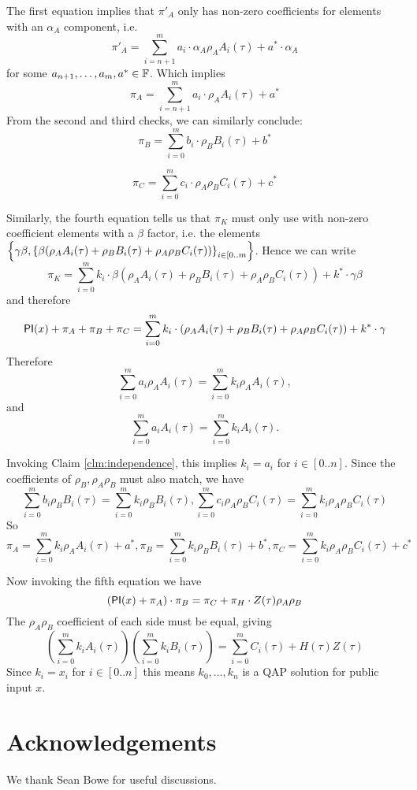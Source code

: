 \documentclass[11pt]{article}
\numberwithin{equation}{section} %
\numberwithin{figure}{section} %
\newcommand{\set}[1]{\ensuremath{\left\{#1\right\}}\xspace}
\begin{document}
The first equation implies that $\pi'_A$ only has non-zero coefficients for elements with an $\alpha_A$ component, i.e.
\[\pi'_A = \sum_{i=n+1}^m a_i\cdot  \alpha_A\rho_A A_i(\tau) + a^*\cdot \alpha_A \]
for some $a_{n+1},\ldots,a_m,a^* \in \mathbb F$.
Which implies 
\[\pi_A = \sum_{i=n+1}^m a_i \cdot \rho_A A_i(\tau) + a^*\]
From the second and third checks, we can similarly conclude:
\[\pi_B = \sum_{i=0}^m b_i\cdot  \rho_B B_i(\tau) + b^*\]

\[\pi_C = \sum_{i=0}^m c_i \cdot \rho_A\rho_B C_i(\tau) + c^*\]

Similarly, the fourth equation tells us that $\pi_K$ must only use with non-zero coefficient elements with a $\beta$ factor,
i.e. the elements $\set{\gamma\beta,\sett{\beta(\rho_A A_i(\tau) + \rho_B B_i(\tau) + \rho_A\rho_B C_i(\tau))}{i\in[0..m}}$.
Hence we can write
\[\pi_K = \sum_{i=0}^m k_i\cdot\beta(\rho_A A_i(\tau) + \rho_B B_i(\tau) + \rho_A\rho_B C_i(\tau)) + k^*\cdot \gamma\beta\]
and therefore
\[\mathsf{PI}(x)+\pi_A +\pi_B+\pi_C= \sum_{i=0}^m k_i\cdot(\rho_A A_i(\tau) + \rho_B B_i(\tau) + \rho_A\rho_B C_i(\tau)) + k^*\cdot \gamma\]
Therefore
\[\sum_{i=0}^m a_i \rho_A A_i(\tau) = \sum_{i=0}^m k_i\rho_A A_i(\tau),\]
and
\[\sum_{i=0}^m a_i A_i(\tau) = \sum_{i=0}^m k_i A_i(\tau).\]

Invoking Claim \ref{clm:independence}, this implies $k_i=a_i$ for $i\in[0..n]$.
Since the coefficients of $\rho_B,\rho_A\rho_B$ must also match, we have
\[\sum_{i=0}^m b_i \rho_B B_i(\tau)= \sum_{i=0}^m k_i \rho_B B_i(\tau),\sum_{i=0}^m c_i \rho_A\rho_B C_i(\tau)=\sum_{i=0}^m k_i \rho_A\rho_B C_i(\tau) \]
So
\[\pi_A=\sum_{i=0}^m k_i \rho_A A_i(\tau)+a^*,\pi_B=\sum_{i=0}^m k_i \rho_B B_i(\tau)+b^*,\pi_C=\sum_{i=0}^m k_i \rho_A\rho_B C_i(\tau)+c^*\]


Now invoking the fifth equation we have
\[(\mathsf{PI}(x)+\pi_A)\cdot \pi_B= \pi_C + \pi_H\cdot Z(\tau)\rho_A\rho_B\]
The $\rho_A\rho_B$ coefficient of each side must be equal, giving
\[(\sum_{i=0}^m k_i A_i(\tau))(\sum_{i=0}^m k_i B_i(\tau)) = \sum_{i=0}^m C_i(\tau) + H(\tau)Z(\tau)\]
Since $k_i=x_i$ for $i\in [0..n]$ this means $k_0,\ldots,k_n$ is a QAP solution for public input $x$.

\section*{Acknowledgements}
We thank Sean Bowe for useful discussions.


\end{document}
